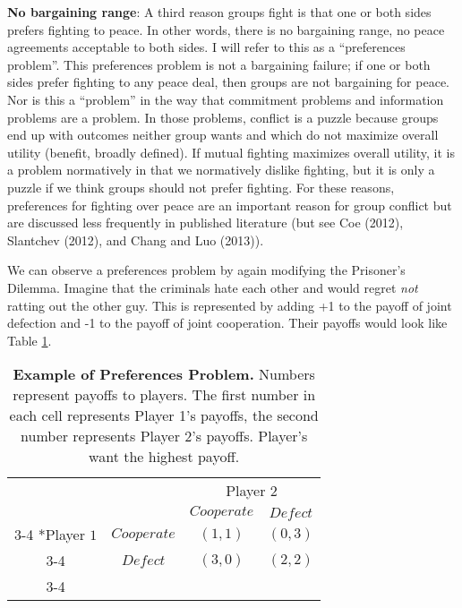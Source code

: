 \documentclass[11pt]{article}
\begin{document}
\noindent \textbf{No bargaining range}: A third reason groups fight is
that one or both sides prefers fighting to peace. In other words, there
is no bargaining range, no peace agreements acceptable to both sides. I
will refer to this as a ``preferences problem''. This preferences
problem is not a bargaining failure; if one or both sides prefer
fighting to any peace deal, then groups are not bargaining for peace.
Nor is this a ``problem'' in the way that commitment problems and
information problems are a problem. In those problems, conflict is a
puzzle because groups end up with outcomes neither group wants and which
do not maximize overall utility (benefit, broadly defined). If mutual
fighting maximizes overall utility, it is a problem normatively in that
we normatively dislike fighting, but it is only a puzzle if we think
groups should not prefer fighting. For these reasons, preferences for
fighting over peace are an important reason for group conflict but are
discussed less frequently in published literature (but see Coe (2012),
Slantchev (2012), and Chang and Luo (2013)).

We can observe a preferences problem by again modifying the Prisoner's
Dilemma. Imagine that the criminals hate each other and would regret
\emph{not} ratting out the other guy. This is represented by adding +1
to the payoff of joint defection and -1 to the payoff of joint
cooperation. Their payoffs would look like Table \ref{tab:prefProb}.

\begin{table}[h!]
\begin{center}
\setlength{\extrarowheight}{2pt}
\begin{tabular}{cc|c|c|}
    & \multicolumn{1}{c}{} & \multicolumn{2}{c}{Player $2$}\\
    & \multicolumn{1}{c}{} & \multicolumn{1}{c}{$Cooperate$}  & \multicolumn{1}{c}{$Defect$} \\\cline{3-4}
    \multirow{2}*{Player $1$}  & $Cooperate$ & $(1,1)$ & $(0,3)$ \\\cline{3-4}
      & $Defect$ & $(3,0)$ & $(2,2)$ \\\cline{3-4}
\end{tabular}
\caption{\label{tab:prefProb}\textbf{Example of Preferences Problem.} Numbers represent payoffs to players.  The first number in each cell represents Player 1's payoffs, the second number represents Player 2's payoffs.  Player's want the highest payoff.}
\end{center}
\end{table}
\end{document}
